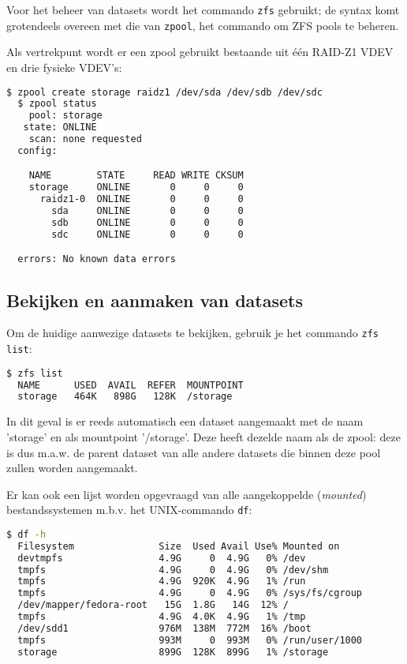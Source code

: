 Voor het beheer van datasets wordt het commando \texttt{zfs} gebruikt; de syntax komt grotendeels overeen met die van \texttt{zpool}, het commando om ZFS pools te beheren. 

Als vertrekpunt wordt er een zpool gebruikt bestaande uit één RAID-Z1 VDEV en drie fysieke VDEV's:

\begin{lstlisting}[language=bash,style=command_style]
  $ zpool create storage raidz1 /dev/sda /dev/sdb /dev/sdc
  $ zpool status
    pool: storage
   state: ONLINE
    scan: none requested
  config:

	NAME        STATE     READ WRITE CKSUM
	storage     ONLINE       0     0     0
	  raidz1-0  ONLINE       0     0     0
	    sda     ONLINE       0     0     0
	    sdb     ONLINE       0     0     0
	    sdc     ONLINE       0     0     0

  errors: No known data errors
\end{lstlisting}

\subsection{Bekijken en aanmaken van datasets}

Om de huidige aanwezige datasets te bekijken, gebruik je het commando \texttt{zfs list}:

\begin{lstlisting}[language=bash,style=command_style] 
  $ zfs list
  NAME      USED  AVAIL  REFER  MOUNTPOINT
  storage   464K   898G   128K  /storage
\end{lstlisting}

In dit geval is er reeds automatisch een dataset aangemaakt met de naam 'storage' en als mountpoint '/storage'. Deze heeft dezelde naam als de zpool: deze is dus m.a.w. de parent dataset van alle andere datasets die binnen deze pool zullen worden aangemaakt.

Er kan ook een lijst worden opgevraagd van alle aangekoppelde (\textit{mounted}) bestandssystemen m.b.v. het UNIX-commando \texttt{df}:

\begin{lstlisting}[language=bash,style=command_style] 
  $ df -h
  Filesystem               Size  Used Avail Use% Mounted on
  devtmpfs                 4.9G     0  4.9G   0% /dev
  tmpfs                    4.9G     0  4.9G   0% /dev/shm
  tmpfs                    4.9G  920K  4.9G   1% /run
  tmpfs                    4.9G     0  4.9G   0% /sys/fs/cgroup
  /dev/mapper/fedora-root   15G  1.8G   14G  12% /
  tmpfs                    4.9G  4.0K  4.9G   1% /tmp
  /dev/sdd1                976M  138M  772M  16% /boot
  tmpfs                    993M     0  993M   0% /run/user/1000
  storage                  899G  128K  899G   1% /storage 
\end{lstlisting}

